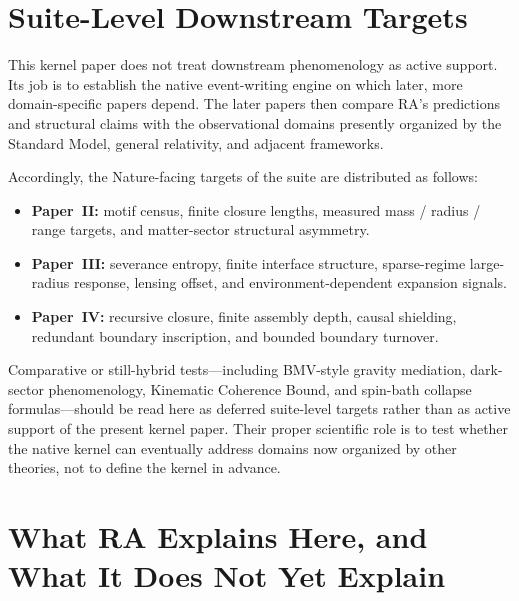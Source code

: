 \documentclass[11pt]{article}
\begin{document}
\section{Suite-Level Downstream Targets}
\label{sec:predictions}

This kernel paper does not treat downstream phenomenology as active support. Its job is to establish the native event-writing engine on which later, more domain-specific papers depend. The later papers then compare RA's predictions and structural claims with the observational domains presently organized by the Standard Model, general relativity, and adjacent frameworks.

Accordingly, the Nature-facing targets of the suite are distributed as follows:
\begin{itemize}
    \item \textbf{Paper~II:} motif census, finite closure lengths, measured mass / radius / range targets, and matter-sector structural asymmetry.
    \item \textbf{Paper~III:} severance entropy, finite interface structure, sparse-regime large-radius response, lensing offset, and environment-dependent expansion signals.
    \item \textbf{Paper~IV:} recursive closure, finite assembly depth, causal shielding, redundant boundary inscription, and bounded boundary turnover.
\end{itemize}

Comparative or still-hybrid tests---including BMV-style gravity mediation, dark-sector phenomenology, Kinematic Coherence Bound, and spin-bath collapse formulas---should be read here as deferred suite-level targets rather than as active support of the present kernel paper. Their proper scientific role is to test whether the native kernel can eventually address domains now organized by other theories, not to define the kernel in advance.

\section{What RA Explains Here, and What It Does Not Yet Explain}
\label{sec:status}
\end{document}
